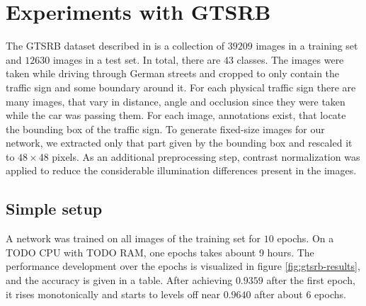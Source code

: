 \documentclass[11pt, a4paper]{article}
\begin{document}
\section{Experiments with GTSRB}
The GTSRB dataset described in \cite{gtsrb} is a collection of $39209$ images in a training set and $12630$ images in a test set. In total, there are $43$ classes. The images were taken while driving through German streets and cropped to only contain the traffic sign and some boundary around it. For each physical traffic sign there are many images, that vary in distance, angle and occlusion since they were taken while the car was passing them. For each image, annotations exist, that locate the bounding box of the traffic sign. To generate fixed-size images for our network, we extracted only that part given by the bounding box and rescaled it to $48\times48$ pixels. As an additional preprocessing step, contrast normalization was applied to reduce the considerable illumination differences present in the images.

\subsection{Simple setup}
\label{subsec:simplesetup}
A network was trained on all images of the training set for $10$ epochs. On a TODO CPU with TODO RAM, one epochs takes abount 9 hours. The performance development over the epochs is visualized in figure \ref{fig:gtsrb-results}, and the accuracy is given in a table. After achieving $0.9359$ after the first epoch, it rises monotonically and starts to levels off near $0.9640$ after about 6 epochs.
\end{document}
